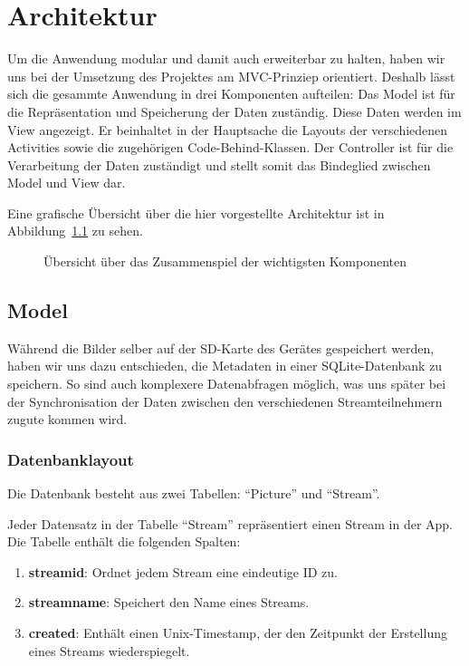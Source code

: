 \chapter{Architektur}

Um die Anwendung modular und damit auch erweiterbar zu halten, haben wir uns bei der Umsetzung des Projektes am MVC-Prinziep orientiert. Deshalb lässt sich die gesammte Anwendung in drei Komponenten aufteilen: Das Model ist für die Repräsentation und Speicherung der Daten zuständig. Diese Daten werden im View angezeigt. Er beinhaltet in der Hauptsache die Layouts der verschiedenen Activities sowie die zugehörigen Code-Behind-Klassen. Der Controller ist für die Verarbeitung der Daten zuständigt und stellt somit das Bindeglied zwischen Model und View dar. 

Eine grafische Übersicht über die hier vorgestellte Architektur ist in Abbildung~\ref{fig:arcdia} zu sehen.
\begin{landscape}
\begin{figure}[htpb]
	\centering
	\scalebox{0.75}{}
	\caption{Übersicht über das Zusammenspiel der wichtigsten Komponenten}
	\label{fig:arcdia}
\end{figure}
\end{landscape}

\section{Model}

Während die Bilder selber auf der SD-Karte des Gerätes gespeichert werden, haben wir uns dazu entschieden, die Metadaten in einer SQLite-Datenbank zu speichern. So sind auch komplexere Datenabfragen möglich, was uns später bei der Synchronisation der Daten zwischen den verschiedenen Streamteilnehmern zugute kommen wird.

\subsection {Datenbanklayout}

Die Datenbank besteht aus zwei Tabellen: \enquote{Picture} und \enquote{Stream}.

Jeder Datensatz in der Tabelle \enquote{Stream} repräsentiert einen Stream in der App. Die Tabelle enthält die folgenden Spalten:
\begin{enumerate}
	\item \textbf{streamid}: Ordnet jedem Stream eine eindeutige ID zu.
	\item \textbf{streamname}: Speichert den Name eines Streams.
	\item \textbf{created}: Enthält einen Unix-Timestamp, der den Zeitpunkt der Erstellung eines Streams wiederspiegelt.
\end{enumerate}

